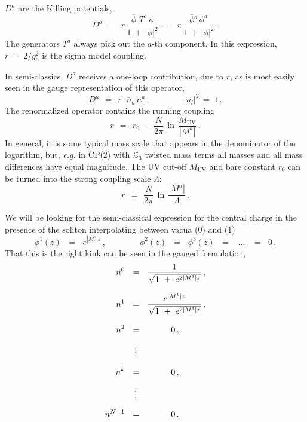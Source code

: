 \documentclass[epsfig,12pt]{article}
\def\beq{\begin{equation}}
\def\eeq{\end{equation}}
\def\beq{\begin{equation}}
\def\eeq{\end{equation}}
\newcommand{\ov}{\overline}
\newcommand{\mc}[1]{\mathcal{#1}}
\newcommand{\bphi}{\ov{\phi}{}}
\begin{document}
       $ D^a $ are the Killing potentials,
\beq
       D^a  ~~=~~ r\, \frac{ \bphi\,\, T^a\, \phi } 
                           {  1  ~+~  |\phi|^2  }
            ~~=~~ r\, \frac{ \bphi^a\, \phi^a   }
                           {  1  ~+~  |\phi|^2  }\,.
\eeq
       The generators $ T^a $ always pick out the $ a $-th component.
       In this expression, $ r ~=~ 2 / g_0^2 $ is the sigma model coupling.

       In semi-classics, $ D^a $ receives a one-loop contribution, due to $ r $, as is 
       most easily seen in the gauge representation of this operator,
\beq
       D^a  ~~=~~ r \cdot \ov{n}{}_a\, n^a \,,\qquad\qquad   | n_l |^2 ~=~ 1\,.
\eeq
       The renormalized operator contains the running coupling 
\beq
       r    ~~=~~ r_0  ~-~ \frac{N}{2\pi}\,\ln\, \frac{M_\text{UV}}
                                                      {   |M^a|   } \,.
\eeq
       In general, it is some typical mass scale that appears in the denominator of the logarithm, but, {\it e.g.}
       in CP(2) with $\mc{Z}_3$ twisted mass terms all masses and all mass differences have equal magnitude. 
       The UV cut-off $ M_\text{UV} $ and bare constant $ r_0 $ can be turned 
       into the strong coupling scale $ \Lambda $:
\beq
       r    ~~=~~ \frac{N}{2\pi}\, \ln\, \frac{   |M^a|   }
                                              {  \Lambda  }\,.
\eeq


       We will be looking for the semi-classical expression for the central charge in the presence
       of the soliton interpolating between vacua ({\sc \small 0}) and ({\sc \small 1})
\beq
       \phi^1(z)  \,~~=~~\, e^{|M^1| z}\,, \qquad\qquad  \phi^2(z) \,~~=~~\, \phi^3(z) \,~~=~~ \,~...~\, ~~=~~\, 0\,.
\eeq
       That this is the right kink can be seen in the gauged formulation,
\begin{align}
%
\notag
       n^0  & ~~=~~ \frac {             1              }
                          {\sqrt{ 1 ~+~ e^{2 |M^1| z} }}\,, \\[3mm]
%
\notag
       n^1  & ~~=~~ \frac {         e^{|M^1| z}        }
                          {\sqrt{ 1 ~+~ e^{2 |M^1| z} }}\,, \\[3mm]
%
\notag
       n^2  & ~~=~~ \qquad~~\, 0\,,  \\[2mm]
%	 
            & ~~~\,\vdots          \\[2mm]
%
\notag
       n^k  & ~~=~~ \qquad~~\, 0\,,  \\[2mm]
%	 
\notag
            & ~~~\,\vdots          \\[2mm]
%
\notag
       n^{N-1} & ~~=~~ \qquad~~\, 0\,.                
\end{align}
\end{document}
